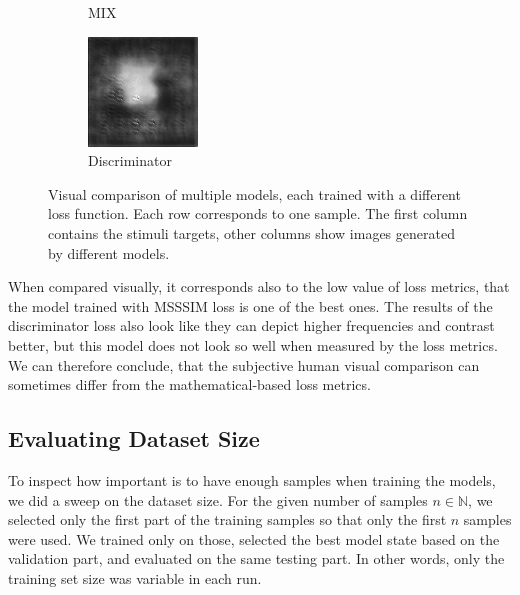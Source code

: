 \begin{figure}[H]
\begin{subfigure}[t]{0.13\textwidth}
    \caption{MIX}
  \end{subfigure}
  \begin{subfigure}[t]{0.13\textwidth}
    \centering
    \includegraphics[width=\linewidth]{img/one-trial/prediction_4_adversarial.png}
    \caption{Discriminator}
  \end{subfigure}
  
\caption{Visual comparison of multiple models, each trained with a different loss function. Each row corresponds to one sample. The first column contains the stimuli targets, other columns show images generated by different models.}
\label{img:experiments:one-trial:finding-best-loss-outputs}
\end{figure}

When compared visually, it corresponds also to the low value of loss metrics, that the model trained with MSSSIM loss is one of the best ones. The results of the discriminator loss also look like they can depict higher frequencies and contrast better, but this model does not look so well when measured by the loss metrics. We can therefore conclude, that the subjective human visual comparison can sometimes differ from the mathematical-based loss metrics.

\subsection{Evaluating Dataset Size}
\label{experiments:one-trial:number-of-samples}
To inspect how important is to have enough samples when training the models, we did a sweep on the dataset size. For the given number of samples $n \in \mathbb{N}$, we selected only the first part of the training samples so that only the first $n$ samples were used. We trained only on those, selected the best model state based on the validation part, and evaluated on the same testing part. In other words, only the training set size was variable in each run.

